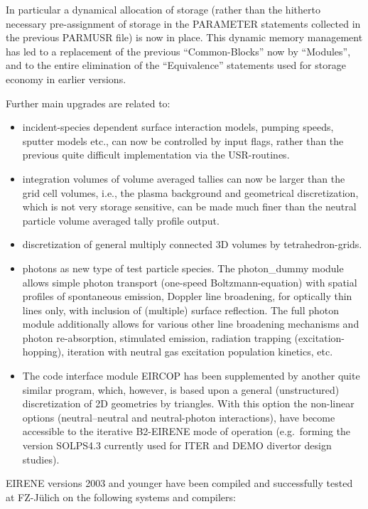 In particular a dynamical allocation of storage (rather than the hitherto
necessary pre-assign\-ment of storage in the PARAMETER statements collected in
the previous PARMUSR file) is now in place.
This dynamic memory management has led to a replacement of the previous
``Common-Blocks'' now by ``Modules'', and to the entire elimination of the
``Equivalence'' statements used for storage economy in earlier versions.

Further main upgrades are related to:
\begin{itemize}
  \item incident-species dependent surface interaction models, pumping speeds,
        sputter models etc., can now be controlled by input flags, rather than the
        previous quite difficult implementation via the USR-routines.
  \item integration volumes of volume averaged tallies can now be larger than the
        grid cell volumes, i.e., the plasma background and geometrical discretization,
        which is not very storage sensitive, can be made much finer than the neutral
        particle volume averaged tally profile output.
  \item discretization of general multiply connected 3D volumes by
        tetrahedron-grids.
  \item photons as new type of test particle species.
        The photon\_dummy module allows simple photon transport (one-speed
        Boltzmann-equation) with spatial profiles of spontaneous emission, Doppler line
        broadening, for optically thin lines only, with inclusion of (multiple) surface
        reflection.
        The full photon module additionally allows for various other line broadening
        mechanisms and photon re-absorption, stimulated emission, radiation trapping
        (excitation-hopping), iteration with neutral gas excitation population
        kinetics, etc.
  \item The code interface module EIRCOP has been supplemented by
        another quite similar program, which, however, is based upon a general
        (unstructured) discretization of 2D geometries by triangles.
        With this option the non-linear options (neutral--neutral  and neutral-photon
        interactions), have become accessible to the iterative B2-EIRENE mode of
        operation (e.g.\ forming the version SOLPS4.3 currently used for ITER and DEMO
        divertor design studies).
\end{itemize}

EIRENE versions 2003 and younger have been compiled and successfully tested at
FZ-J{\"u}lich on the following systems and compilers:

